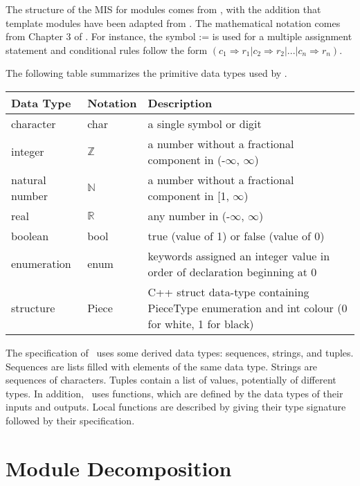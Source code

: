 \documentclass[12pt, titlepage]{article}
\begin{document}

The structure of the MIS for modules comes from \citet{HoffmanAndStrooper1995},
with the addition that template modules have been adapted from
\cite{GhezziEtAl2003}.  The mathematical notation comes from Chapter 3 of
\citet{HoffmanAndStrooper1995}.  For instance, the symbol := is used for a
multiple assignment statement and conditional rules follow the form $(c_1
\Rightarrow r_1 | c_2 \Rightarrow r_2 | ... | c_n \Rightarrow r_n )$.

The following table summarizes the primitive data types used by \progname. 

\begin{center}
\renewcommand{\arraystretch}{1.2}
\noindent 
\begin{tabular}{l l p{7.5cm}} 
\toprule 
\textbf{Data Type} & \textbf{Notation} & \textbf{Description}\\ 
\midrule
character & char & a single symbol or digit\\
integer & $\mathbb{Z}$ & a number without a fractional component in (-$\infty$, $\infty$) \\
natural number & $\mathbb{N}$ & a number without a fractional component in [1, $\infty$) \\
real & $\mathbb{R}$ & any number in (-$\infty$, $\infty$)\\
boolean & bool & true (value of 1) or false (value of 0)\\
enumeration & enum & keywords assigned an integer value in order of declaration beginning at 0\\
structure & Piece & C++ struct data-type containing PieceType enumeration and int colour (0 for white, 1 for black)\\
\bottomrule
\end{tabular} 
\end{center}

\noindent
The specification of \progname \ uses some derived data types: sequences, strings, and
tuples. Sequences are lists filled with elements of the same data type. Strings
are sequences of characters. Tuples contain a list of values, potentially of
different types. In addition, \progname \ uses functions, which
are defined by the data types of their inputs and outputs. Local functions are
described by giving their type signature followed by their specification.

\section{Module Decomposition}
\end{document}
